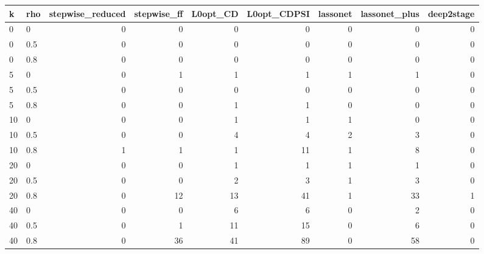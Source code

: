 \begin{tabular}{llrrrrrrr}
\toprule
k & rho & stepwise\_reduced & stepwise\_ff & L0opt\_CD & L0opt\_CDPSI & lassonet & lassonet\_plus & deep2stage \\
\midrule
0 & 0 & 0 & 0 & 0 & 0 & 0 & 0 & 0 \\
0 & 0.5 & 0 & 0 & 0 & 0 & 0 & 0 & 0 \\
0 & 0.8 & 0 & 0 & 0 & 0 & 0 & 0 & 0 \\
5 & 0 & 0 & 1 & 1 & 1 & 1 & 1 & 0 \\
5 & 0.5 & 0 & 0 & 0 & 0 & 0 & 0 & 0 \\
5 & 0.8 & 0 & 0 & 1 & 1 & 0 & 0 & 0 \\
10 & 0 & 0 & 0 & 1 & 1 & 1 & 0 & 0 \\
10 & 0.5 & 0 & 0 & 4 & 4 & 2 & 3 & 0 \\
10 & 0.8 & 1 & 1 & 1 & 11 & 1 & 8 & 0 \\
20 & 0 & 0 & 0 & 1 & 1 & 1 & 1 & 0 \\
20 & 0.5 & 0 & 0 & 2 & 3 & 1 & 3 & 0 \\
20 & 0.8 & 0 & 12 & 13 & 41 & 1 & 33 & 1 \\
40 & 0 & 0 & 0 & 6 & 6 & 0 & 2 & 0 \\
40 & 0.5 & 0 & 1 & 11 & 15 & 0 & 6 & 0 \\
40 & 0.8 & 0 & 36 & 41 & 89 & 0 & 58 & 0 \\
\bottomrule
\end{tabular}
